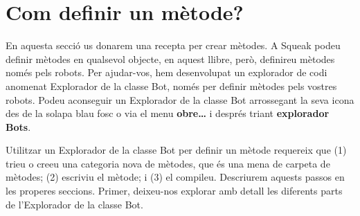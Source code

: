 \section{Com definir un mètode?}
En aquesta secció us donarem una recepta per crear mètodes. A Squeak podeu definir mètodes en qualsevol objecte, en aquest llibre, però, definireu mètodes només pels robots. Per ajudar-vos, hem desenvolupat un explorador de codi anomenat \textsf{Explorador de la classe Bot}, només per definir mètodes pels vostres robots. Podeu aconseguir un \textsf{Explorador de la classe Bot} arrossegant la seva icona des de la solapa blau fosc o via el menu \textbf{obre\dots} i després triant \textbf{explorador Bots}.

Utilitzar un \textsf{Explorador de la classe Bot} per definir un mètode requereix que (1) trieu o creeu una categoria nova de mètodes, que és una mena de carpeta de mètodes; (2) escriviu el mètode; i (3) el compileu. Descriurem aquests passos en les properes seccions. Primer, deixeu-nos explorar amb detall les diferents parts de l'\textsf{Explorador de la classe Bot}.

